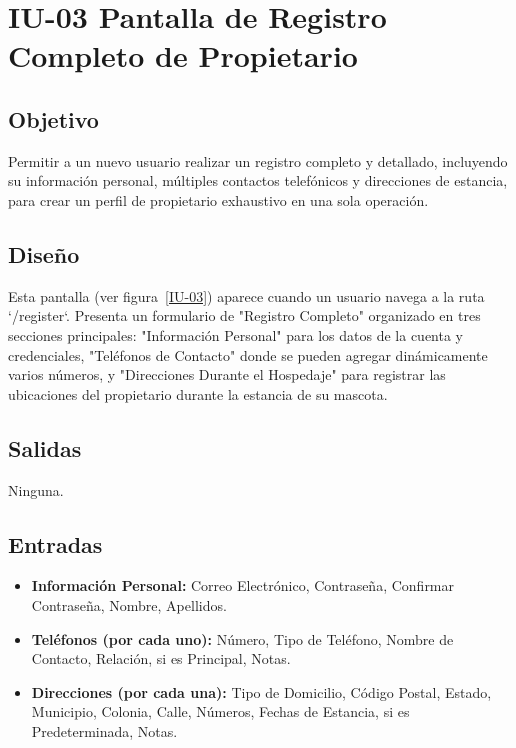 \section{IU-03 Pantalla de Registro Completo de Propietario}

\subsection{Objetivo}
    Permitir a un nuevo usuario realizar un registro completo y detallado, incluyendo su información personal, múltiples contactos telefónicos y direcciones de estancia, para crear un perfil de propietario exhaustivo en una sola operación.

\subsection{Diseño}
    Esta pantalla  (ver figura~\ref{IU-03}) aparece cuando un usuario navega a la ruta `/register`. Presenta un formulario de "Registro Completo" organizado en tres secciones principales: "Información Personal" para los datos de la cuenta y credenciales, "Teléfonos de Contacto" donde se pueden agregar dinámicamente varios números, y "Direcciones Durante el Hospedaje" para registrar las ubicaciones del propietario durante la estancia de su mascota.


\subsection{Salidas}
    Ninguna.

\subsection{Entradas}
\begin{itemize}
    \item \textbf{Información Personal:} Correo Electrónico, Contraseña, Confirmar Contraseña, Nombre, Apellidos.
    \item \textbf{Teléfonos (por cada uno):} Número, Tipo de Teléfono, Nombre de Contacto, Relación, si es Principal, Notas.
    \item \textbf{Direcciones (por cada una):} Tipo de Domicilio, Código Postal, Estado, Municipio, Colonia, Calle, Números, Fechas de Estancia, si es Predeterminada, Notas.
\end{itemize}

